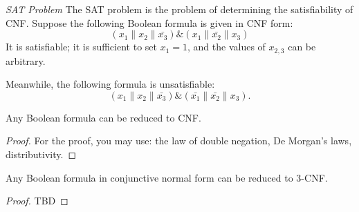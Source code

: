 \begin{example}
\emph{SAT Problem}
\label{exAddAlgoSAT}
The SAT problem is the problem of determining the satisfiability of CNF. Suppose the following Boolean formula is given in CNF form:
\begin{equation}
\left(x_1 \| x_2 \| \bar{x_3} \right) \& \left(x_1 \| \bar{x_2} \| x_3 \right)
\nonumber
\end{equation}
It is satisfiable; it is sufficient to set $x_1 = 1$, and the values of $x_{2,3}$ can be arbitrary.

Meanwhile, the following formula is unsatisfiable:
\begin{equation}
\left(x_1 \| x_2 \| \bar{x_3} \right) \& 
\left(\bar{x_1} \| \bar{x_2} \| x_3 \right).
\nonumber
\end{equation}

\end{example}

\begin{theorem}
Any Boolean formula can be reduced to CNF. 
\end{theorem}

\begin{proof}
For the proof, you may use: the law of double negation, De Morgan's laws, distributivity.
\end{proof}

\begin{theorem}
Any Boolean formula in conjunctive normal form can be reduced to 3-CNF.  
\end{theorem}

\begin{proof}
TBD
\end{proof}
